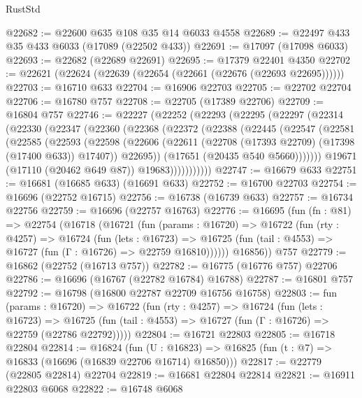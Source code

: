 \begin{lexlean}{RustStd}
\begin{coremodule}
@22682 := @22600 @635 @108 @35 @14 @6033 @4558
@22689 := @22497 @433 @35 @433 @6033 (@17089 (@22502 @433))
@22691 := @17097 (@17098 @6033)
@22693 := @22682 (@22689 @22691)
@22695 := @17379 @22401 @4350
@22702 := @22621 (@22624 (@22639 (@22654 (@22661 (@22676 (@22693 @22695))))))
@22703 := @16710 @633
@22704 := @16906 @22703
@22705 := @22702 @22704
@22706 := @16780 @757
@22708 := @22705 (@17389 @22706)
@22709 := @16804 @757
@22746 := @22227
    (@22252
      (@22293
        (@22295
          (@22297
            (@22314
              (@22330
                (@22347
                  (@22360
                    (@22368
                      (@22372
                        (@22388
                          (@22445
                            (@22547
                              (@22581
                                (@22585
                                  (@22593
                                    (@22598
                                      (@22606
                                        (@22611
                                          (@22708 (@17393 @22709) (@17398 (@17400 @633)) @17407))
                                        @22695))
                                    (@17651 (@20435 @540 @5660)))))))
                          @19671
                          (@17110 (@20462 @649 @87))
                          @19683)))))))))))
@22747 := @16679 @633
@22751 := @16681 (@16685 @633) (@16691 @633)
@22752 := @16700 @22703
@22754 := @16696 (@22752 @16715)
@22756 := @16738 (@16739 @633)
@22757 := @16734 @22756
@22759 := @16696 (@22757 @16763)
@22776 := @16695
    (fun (fn : @81) =>
    @22754
      (@16718
        (@16721
          (fun (params : @16720) =>
          @16722
            (fun (rty : @4257) =>
            @16724
              (fun (lets : @16723) =>
              @16725 (fun (tail : @4553) => @16727 (fun (Γ : @16726) => @22759 @16810))))))
        @16856))
    @757
@22779 := @16862 (@22752 (@16713 @757))
@22782 := @16775 (@16776 @757) @22706
@22786 := @16696 (@16767 (@22782 @16784) @16788)
@22787 := @16801 @757
@22792 := @16798 (@16800 @22787 @22709 @16756 @16758)
@22803 := fun (params : @16720) =>
  @16722
    (fun (rty : @4257) =>
    @16724
      (fun (lets : @16723) =>
      @16725 (fun (tail : @4553) => @16727 (fun (Γ : @16726) => @22759 (@22786 @22792)))))
@22804 := @16721 @22803
@22805 := @16718 @22804
@22814 := @16824
    (fun (U : @16823) => @16825 (fun (t : @7) => @16833 (@16696 (@16839 @22706 @16714) @16850)))
@22817 := @22779 (@22805 @22814) @22704
@22819 := @16681 @22804 @22814
@22821 := @16911 @22803 @6068
@22822 := @16748 @6068

\end{coremodule}
\end{lexlean}

